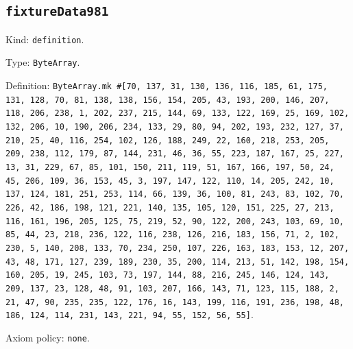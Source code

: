 \documentclass[11pt]{article}
\begin{document}
\subsection*{\texttt{fixtureData981}}
\noindent Kind: \texttt{definition}.\par
\noindent Type: \texttt{ByteArray}.\par
\noindent Definition: \texttt{ByteArray.mk \#[70, 137, 31, 130, 136, 116, 185, 61, 175, 131, 128, 70, 81, 138, 138, 156, 154, 205, 43, 193, 200, 146, 207, 118, 206, 238, 1, 202, 237, 215, 144, 69, 133, 122, 169, 25, 169, 102, 132, 206, 10, 190, 206, 234, 133, 29, 80, 94, 202, 193, 232, 127, 37, 210, 25, 40, 116, 254, 102, 126, 188, 249, 22, 160, 218, 253, 205, 209, 238, 112, 179, 87, 144, 231, 46, 36, 55, 223, 187, 167, 25, 227, 13, 31, 229, 67, 85, 101, 150, 211, 119, 51, 167, 166, 197, 50, 24, 45, 206, 109, 36, 153, 45, 3, 197, 147, 122, 110, 14, 205, 242, 10, 137, 124, 181, 251, 253, 114, 66, 139, 36, 100, 81, 243, 83, 102, 70, 226, 42, 186, 198, 121, 221, 140, 135, 105, 120, 151, 225, 27, 213, 116, 161, 196, 205, 125, 75, 219, 52, 90, 122, 200, 243, 103, 69, 10, 85, 44, 23, 218, 236, 122, 116, 238, 126, 216, 183, 156, 71, 2, 102, 230, 5, 140, 208, 133, 70, 234, 250, 107, 226, 163, 183, 153, 12, 207, 43, 48, 171, 127, 239, 189, 230, 35, 200, 114, 213, 51, 142, 198, 154, 160, 205, 19, 245, 103, 73, 197, 144, 88, 216, 245, 146, 124, 143, 209, 137, 23, 128, 48, 91, 103, 207, 166, 143, 71, 123, 115, 188, 2, 21, 47, 90, 235, 235, 122, 176, 16, 143, 199, 116, 191, 236, 198, 48, 186, 124, 114, 231, 143, 221, 94, 55, 152, 56, 55]}.\par
\noindent Axiom policy: \texttt{none}.\par
\end{document}
